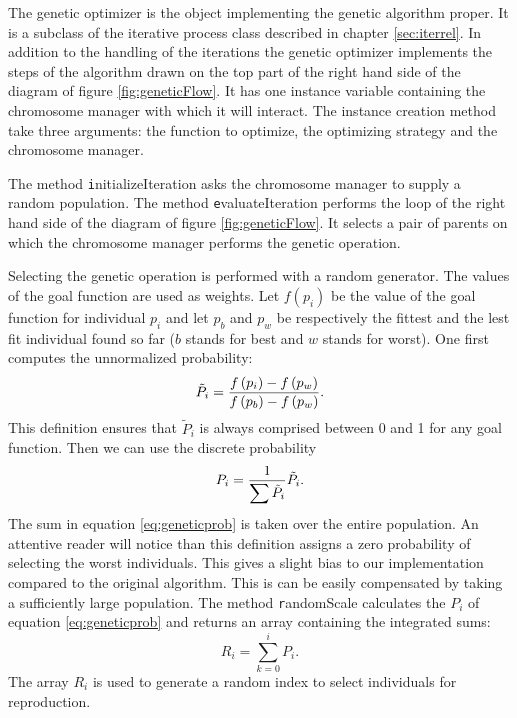 The genetic optimizer is the object implementing the genetic
algorithm proper. It is a subclass of the iterative process class
described in chapter \ref{sec:iterrel}. In addition to the
handling of the iterations the genetic optimizer implements the
steps of the algorithm drawn on the top part of the right hand
side of the diagram of figure \ref{fig:geneticFlow}. It has one
instance variable containing the chromosome manager with which it
will interact. The instance creation method take three arguments:
the function to optimize, the optimizing strategy and the
chromosome manager.

The method {\texttt initializeIteration} asks the chromosome manager
to supply a random population. The method {\texttt evaluateIteration}
performs the loop of the right hand side of the diagram of figure
\ref{fig:geneticFlow}. It selects a pair of parents on which the
chromosome manager performs the genetic operation.

Selecting the genetic operation is performed with a random
generator. The values of the goal function are used as weights.
Let $f\left(p_i\right)$ be the value of the goal function for
individual $p_i$ and let $p_b$ and $p_w$ be respectively the
fittest and the lest fit individual found so far ($b$ stands for
best and $w$ stands for worst). One first computes the
unnormalized probability:
\begin{equation}
  \tilde{P}_i={\displaystyle f\left(p_i\right) - f\left(p_w\right)
  \over\displaystyle f\left(p_b\right) - f\left(p_w\right)}.
\end{equation}
This definition ensures that $\tilde{P}_i$ is always comprised
between 0 and 1 for any goal function. Then we can use the
discrete probability
\begin{equation}
\label{eq:geneticprob}
  P_i={\displaystyle  1
  \over\displaystyle \sum\tilde{P}_i} \tilde{P}_i.
\end{equation}
The sum in equation \ref{eq:geneticprob} is taken over the entire
population. An attentive reader will notice than this definition
assigns a zero probability of selecting the worst individuals.
This gives a slight bias to our implementation compared to the
original algorithm. This is can be easily compensated by taking a
sufficiently large population. The method {\texttt randomScale}
calculates the $P_i$ of equation \ref{eq:geneticprob} and returns
an array containing the integrated sums:
\begin{equation}
  R_i=\sum_{k=0}^i P_i.
\end{equation}
The array $R_i$ is used to generate a random index to select
individuals for reproduction.

